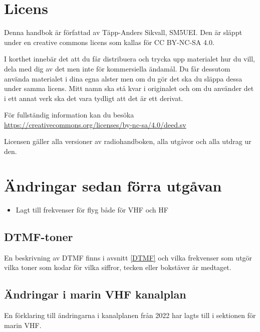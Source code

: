 
\section{Licens}

Denna handbok är författad av Täpp-Anders Sikvall, SM5UEI. Den är
släppt under en creative commons licens som kallas för CC BY-NC-SA 4.0.

I korthet innebär det att du får distribuera och trycka upp materialet
hur du vill, dela med dig av det men inte för kommersiella ändamål. Du
får dessutom använda materialet i dina egna alster men om du gör det
ska du släppa dessa under samma licens. Mitt namn ska stå kvar i
originalet och om du använder det i ett annat verk ska det vara
tydligt att det är ett derivat.

För fullständig information kan du besöka\\
\url{https://creativecommons.org/licenses/by-nc-sa/4.0/deed.sv}

Licensen gäller alla versioner av radiohandboken, alla utgåvor och
alla utdrag ur den.


\clearpage

\section{Ändringar sedan förra utgåvan}

\begin{itemize}
	\item Lagt till frekvenser för flyg både för VHF och HF
\end{itemize}

\subsection*{DTMF-toner}

En beskrivning av DTMF finns i avsnitt \ref{DTMF} och vilka frekvenser som utgör
vilka toner som kodar för vilka siffror, tecken eller bokstäver är medtaget.

\subsection*{Ändringar i marin VHF kanalplan}

En förklaring till ändringarna i kanalplanen från 2022 har lagts till i sektionen
för marin VHF.

